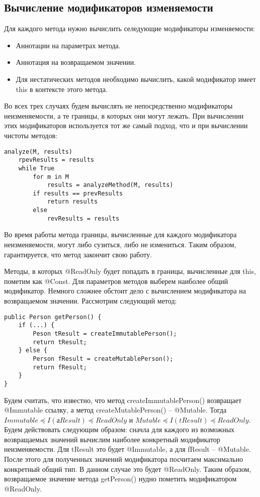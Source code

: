 \subsection{Вычисление модификаторов изменяемости} 

Для каждого метода нужно вычислить селедующие модификаторы изменяемости:
\begin{itemize}
    \item Аннотации на параметрах метода.
    \item Аннотация на возвращаемом значении.
    \item Для нестатических методов необходимо вычислить, какой модификатор имеет this в контексте этого метода.
\end{itemize}

Во всех трех случаях будем вычислять не непосредственно модификаторы неизменяемости, а те границы, в которых они могут лежать. При вычислении этих модификаторов используется тот же самый подход, что и при вычислении чистоты методов:

\begin{lstlisting}[caption=Анализ модификаторов изменяемости для методов, label=code:mutability]
analyze(M, results)
    rpevResults = results    
    while True 
        for m in M 
            results = analyzeMethod(M, results)
        if results == prevResults 
            return results        
        else 
            revResults = results
\end{lstlisting}

Во время работы метода границы, вычисленные для каждого модификатора неизменяемости, могут либо сузиться, либо не измениться. Таким образом, гарантируется, что метод закончит свою работу.

Методы, в которых @ReadOnly будет попадать в границы, вычисленные для this, пометим как @Const. Для параметров методов выберем наиболее общий модификатор. Немного сложнее обстоит дело с вычислением модификатора на возвращаемом значении. Рассмотрим следующий метод:

\begin{lstlisting}[caption=Вывод модификатора неизменяемости для возвращаемого методом значения, label=code:return_value_analyze]
public Person getPerson() {
    if (...) {
        Peson tResult = createImmutablePerson();
        return tResult;
    } else {
        Person fResult = createMutablePerson();
        return fResult;
    } 
} 
\end{lstlisting}

Будем считать, что известно, что метод createImmutablePerson() возвращает @Immutable ссылку, а метод createMutablePerson() -- @Mutable. Тогда $Immutable \preceq I(аResult) \preceq ReadOnly$ и $Mutable \preceq I(tResult) \preceq ReadOnly$. Будем действовать следующим образом: сначла для каждого из возможных возвращаемых значений вычислим наиболее конкретный модификатор неизменяемости. Для tResult это будет @Immutable, а для fResult -- @Mutable. После этого для полученных значений модификатора посчитаем максимально конкретный общий тип. В данном случае это будет @ReadOnly. Таким образом, возвращаемое значение метода getPerson() нудно пометить модификатором @ReadOnly. 

